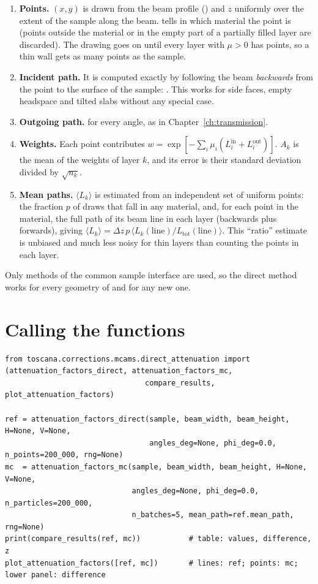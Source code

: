 \begin{enumerate}
  \item \textbf{Points.} $(x,y)$ is drawn from the beam profile () and $z$ uniformly over the extent of the sample along the beam.
         tells in which material the point is (points outside the material or in the empty part of a partially filled layer
        are discarded). The drawing goes on until every layer with $\mu>0$ has  points, so a thin wall gets as many points as the
        sample.
  \item \textbf{Incident path.} It is computed exactly by following the beam \emph{backwards} from the point to the surface of the sample:
        . This works for side faces, empty headspace and tilted slabs without any special case.
  \item \textbf{Outgoing path.}  for every angle, as in Chapter~\ref{ch:transmission}.
  \item \textbf{Weights.} Each point contributes $w=\exp[-\sum_i\mu_i(L^{\mathrm{in}}_i+L^{\mathrm{out}}_i)]$. $A_k$ is the mean of the weights of
        layer $k$, and its error is their standard deviation divided by $\sqrt{n_k}$.
  \item \textbf{Mean paths.} $\langle L_k\rangle$ is estimated from an independent set of uniform points: the fraction $p$ of draws that fall in any
        material, and, for each point in the material, the full path of its beam line in each layer (backwards plus forwards), giving
        $\langle L_k\rangle=\Delta z\,p\,\langle L_k(\text{line})/L_{\mathrm{tot}}(\text{line})\rangle$. This ``ratio'' estimate is unbiased and
        much less noisy for thin layers than counting the points in each layer.
\end{enumerate}
Only methods of the common sample interface are used, so the direct method works for every geometry of \mcams{} and for any new one.

\section{Calling the functions}

\begin{lstlisting}
from toscana.corrections.mcams.direct_attenuation import (attenuation_factors_direct, attenuation_factors_mc,
                                compare_results, plot_attenuation_factors)

ref = attenuation_factors_direct(sample, beam_width, beam_height, H=None, V=None,
                                 angles_deg=None, phi_deg=0.0, n_points=200_000, rng=None)
mc  = attenuation_factors_mc(sample, beam_width, beam_height, H=None, V=None,
                             angles_deg=None, phi_deg=0.0, n_particles=200_000,
                             n_batches=5, mean_path=ref.mean_path, rng=None)
print(compare_results(ref, mc))           # table: values, difference, z
plot_attenuation_factors([ref, mc])       # lines: ref; points: mc; lower panel: difference
\end{lstlisting}

